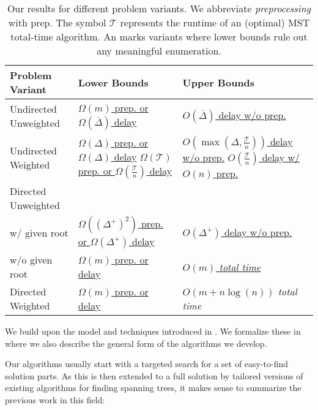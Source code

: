 \documentclass[a4paper, USenglish, cleveref, autoref, thm-restate]{lipics-v2021}
\newcommand{\xmark}{\ding{55}}
\newcommand{\maxdeg}{\Delta}
\newcommand{\maxoutdeg}{\Delta^+}
\newcommand{\avgdeg}{\overline{\Delta}}
\newcommand{\totaltime}{\mathcal{T}}
\begin{document}
\begin{table*}[t]
	\caption{%
		Our results for different problem variants.
		We abbreviate \textit{preprocessing} with prep.
		The symbol $\totaltime$ represents the runtime of an (optimal) MST total-time algorithm.
		An \xmark{} marks variants where lower bounds rule out any meaningful enumeration.
	}
	\label{tab:results}
	\centering
	\begin{tabularx}{\textwidth}{lXX}
		\toprule
		Problem Variant & Lower Bounds & Upper Bounds \\ \midrule
		Undirected Unweighted & \hyperref[thm:uust-lower]{$\Omega(m)$ prep. or $\Omega(\avgdeg)$ delay} & \hyperref[thm:uust-upper]{$O(\avgdeg)$ delay w/o prep.} \\
		Undirected Weighted & \makecell[tl]{\hyperref[thm:mst-maxdeg-lower]{$\Omega(\maxdeg)$ prep. or $\Omega(\maxdeg)$ delay}\\ \hyperref[cor:mst-algo-lower]{$\Omega(\totaltime)$ prep. or $\Omega(\frac{\totaltime}{n})$ delay}} & \makecell[tl]{\hyperref[thm:mst-maxdeg-upper]{$O(\max(\maxdeg,\frac{\totaltime}{n}))$ delay w/o prep.}\\ \hyperref[thm:mst-algo-upper]{$O(\frac{\totaltime}{n})$ delay w/ $O(n)$ prep.}} \\
		Directed Unweighted & & \\
		\qquad w/ given root & \hyperref[thm:dste-with-r-lower]{$\Omega((\maxoutdeg)^2)$ prep. or $\Omega(\maxoutdeg)$ delay} & \hyperref[cor:dste-with-r-upper]{$O(\maxoutdeg)$ delay w/o prep.} \\
		\qquad w/o given root & \hyperref[thm:dste-lower]{$\Omega(m)$ prep. or delay} & {\xmark} \hyperref[thm:dst-upper]{\textit{$O(m)$ total time}} \\
		Directed Weighted & \hyperref[thm:mdste-lower]{$\Omega(m)$ prep. or delay} & {\xmark} \textit{$O(m + n\log(n))$ total time \cite{gabowEfficientAlgorithmsFinding1986}} \\ \bottomrule
	\end{tabularx}
\end{table*}

We build upon the model and techniques introduced in \cite{caselShortestDistancesEnumeration2024}.
We formalize these in  where we also describe the general form of the algorithms we develop.

Our algorithms usually start with a targeted search for a set of easy-to-find solution parts.
As this is then extended to a full solution by tailored versions of existing algorithms for finding spanning trees, it makes sense to summarize the previous work in this field:
\end{document}
